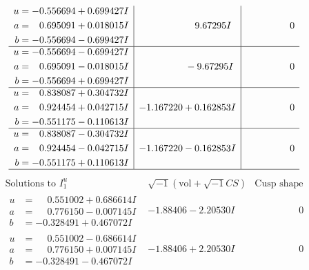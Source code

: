 \documentclass[1p]{elsarticle_modified}
\theoremstyle{definition}
\newcommand{\I}{\sqrt{-1}}
\begin{document}
$$\begin{array}{c|c|c}
\begin{aligned}
u &= -0.556694 + 0.699427 I \\
a &= \phantom{-}0.695091 + 0.018015 I \\
b &= -0.556694 - 0.699427 I\end{aligned}
 & \phantom{-0.000000 -}9.67295 I & \phantom{-0.000000 } 0 \\ \hline\begin{aligned}
u &= -0.556694 - 0.699427 I \\
a &= \phantom{-}0.695091 - 0.018015 I \\
b &= -0.556694 + 0.699427 I\end{aligned}
 & \phantom{-0.000000 } -9.67295 I & \phantom{-0.000000 } 0 \\ \hline\begin{aligned}
u &= \phantom{-}0.838087 + 0.304732 I \\
a &= \phantom{-}0.924454 + 0.042715 I \\
b &= -0.551175 - 0.110613 I\end{aligned}
 & -1.167220 + 0.162853 I & \phantom{-0.000000 } 0 \\ \hline\begin{aligned}
u &= \phantom{-}0.838087 - 0.304732 I \\
a &= \phantom{-}0.924454 - 0.042715 I \\
b &= -0.551175 + 0.110613 I\end{aligned}
 & -1.167220 - 0.162853 I & \phantom{-0.000000 } 0\\
 \hline 
 \end{array}$$\newpage$$\begin{array}{c|c|c}  
\text{Solutions to }I^u_{1}& \I (\text{vol} + \sqrt{-1}CS) & \text{Cusp shape}\\
 \hline 
\begin{aligned}
u &= \phantom{-}0.551002 + 0.686614 I \\
a &= \phantom{-}0.776150 - 0.007145 I \\
b &= -0.328491 + 0.467072 I\end{aligned}
 & -1.88406 - 2.20530 I & \phantom{-0.000000 } 0 \\ \hline\begin{aligned}
u &= \phantom{-}0.551002 - 0.686614 I \\
a &= \phantom{-}0.776150 + 0.007145 I \\
b &= -0.328491 - 0.467072 I\end{aligned}
 & -1.88406 + 2.20530 I & \phantom{-0.000000 } 0 \\ \hline\begin{aligned}

\end{aligned}
\end{array}$$
\end{document}
